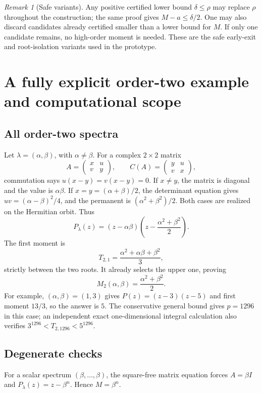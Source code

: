 \documentclass[11pt]{article}
\theoremstyle{definition}\newtheorem{definition}[theorem]{Definition}
\theoremstyle{remark}\newtheorem{remark}[theorem]{Remark}
\begin{document}
\begin{remark}[Safe variants]
Any positive certified lower bound $\delta\leq\rho$ may replace $\rho$ throughout the construction; the same proof gives $M-a\leq\delta/2$. One may also discard candidates already certified smaller than a lower bound for $M$. If only one candidate remains, no high-order moment is needed. These are the safe early-exit and root-isolation variants used in the prototype.
\end{remark}

\section{A fully explicit order-two example and computational scope}
\subsection{All order-two spectra}
Let $\lambda=(\alpha,\beta)$, with $\alpha\ne\beta$. For a complex $2\times2$ matrix
\[
 A=\begin{pmatrix}x&u\\v&y\end{pmatrix},\qquad
 C(A)=\begin{pmatrix}y&u\\v&x\end{pmatrix},
\]
commutation says $u(x-y)=v(x-y)=0$. If $x\ne y$, the matrix is diagonal and the value is $\alpha\beta$. If $x=y=(\alpha+\beta)/2$, the determinant equation gives $uv=(\alpha-\beta)^2/4$, and the permanent is $(\alpha^2+\beta^2)/2$. Both cases are realized on the Hermitian orbit. Thus
\[
 P_\lambda(z)=(z-\alpha\beta)
      \left(z-\frac{\alpha^2+\beta^2}{2}\right).
\]
The first moment is
\[
 T_{2,1}=\frac{\alpha^2+\alpha\beta+\beta^2}{3},
\]
strictly between the two roots. It already selects the upper one, proving
\[
 \boxed{M_2(\alpha,\beta)=\frac{\alpha^2+\beta^2}{2}.}
\]
For example, $(\alpha,\beta)=(1,3)$ gives $P(z)=(z-3)(z-5)$ and first moment $13/3$, so the answer is $5$. The conservative general bound gives $p=1296$ in this case; an independent exact one-dimensional integral calculation also verifies $3^{1296}<T_{2,1296}<5^{1296}$.

\subsection{Degenerate checks}
For a scalar spectrum $(\beta,\ldots,\beta)$, the square-free matrix equation forces $A=\beta I$ and $P_\lambda(z)=z-\beta^n$. Hence $M=\beta^n$.
\end{document}
